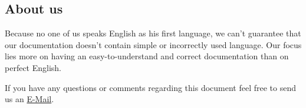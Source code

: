 \subsection*{About us}
Because no one of us speaks English as his first language,
we can't guarantee that our documentation doesn't contain simple
or incorrectly used language. Our focus lies more on
having an easy-to-understand and correct documentation
than on perfect English.%

If you have any questions or comments regarding this document feel free to send us an 
 \href{mailto:pse10-group14-ws12@ira.uni-karlsruhe.de}{E-Mail}.







